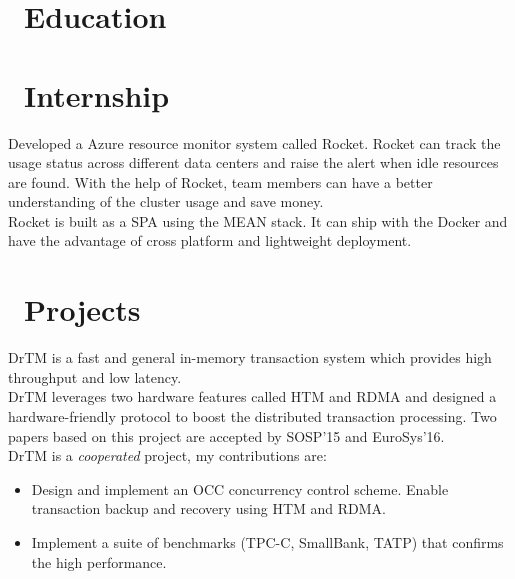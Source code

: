 \documentclass{resume}
\begin{document}



\section{\faGraduationCap\ Education}

\section{\faBriefcase\ Internship}
Developed a Azure resource monitor system called Rocket. Rocket can track the usage status across different data centers and raise the alert when idle resources are found. With the help of Rocket, team members can have a better understanding of the cluster usage and save money.
\\[2pt]
Rocket is built as a SPA using the MEAN stack. It can ship with the Docker and have the advantage of cross platform and lightweight deployment.

\section{\faUsers\ Projects}
DrTM is a fast and general in-memory transaction system which provides high throughput and low latency.
\\[2pt]
DrTM leverages two hardware features called HTM and RDMA and designed a hardware-friendly protocol to boost the distributed transaction processing. Two papers based on this project are accepted by SOSP’15 and EuroSys’16.
\\[2pt]
DrTM is a \textit{cooperated} project, my contributions are:
\begin{itemize}
  \item {Design and implement an OCC concurrency control scheme. Enable transaction backup and recovery using HTM and RDMA.}
  \item {Implement a suite of benchmarks (TPC-C, SmallBank, TATP) that confirms the high performance.}
\end{itemize}
\end{document}

